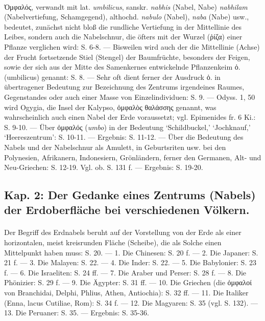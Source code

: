 \documentclass[a4paper, 11pt, oneside]{article}
\begin{document}
\paragraph{}
Ὀμφαλός, verwandt mit lat. \emph{umbilicus}, sanskr. \emph{nabhis} (Nabel, Nabe) \emph{nabhilam} (Nabelvertiefung, Schamgegend), althochd. \emph{nabulo} (Nabel), \emph{naba} (Nabe) usw., bedeutet, zunächst nicht bloß die rundliche Vertiefung in der Mittellinie des Leibes, sondern auch die Nabelschnur, die öfters mit der Wurzel (ῥίζα) einer Pflanze verglichen wird: S. 6-8. --- Bisweilen wird auch der die Mittellinie (Achse) der Frucht fortsetzende Stiel (Stengel) der Baumfrüchte, besonders der Feigen, sowie der sich aus der Mitte des Samenkernes entwickelnde Pflanzenkeim ὀ. (umbilicus) genannt: S. 8. --- Sehr oft dient ferner der Ausdruck ὀ. in übertragener Bedeutung zur Bezeichnung des Zentrums irgendeines Raumes, Gegenstandes oder auch einer Masse von Einzelindividuen: S. 9. --- Odyss. 1, 50 wird Ogygia, die Insel der Kalypso, ὀμφαλὸς θαλάσσης genannt, was wahrscheinlich auch einen Nabel der Erde voraussetzt; vgl. Epimenides fr. 6 Ki.: S. 9-10. --- Über ὀμφαλός (\emph{umbo}) in der Bedeutung `Schildbuckel,' `Jochknauf,' `Heereszentrum': S. 10-11. --- Ergebnis: S. 11-12. --- Über die Bedeutung des Nabels und der Nabelschnur als Amulett, in Geburtsriten usw. bei den Polynesien, Afrikanern, Indonesiern, Grönländern, ferner den Germanen, Alt- und Neu-Griechen: S. 12-19. Vgl. ob. S. 131 f. --- Ergebnis: S. 19-20.

\subsection*{Kap. 2: Der Gedanke eines Zentrums (Nabels) der Erdoberfläche bei verschiedenen Völkern.}
\paragraph{}
Der Begriff des Erdnabels beruht auf der Vorstellung von der Erde als einer horizontalen, meist kreisrunden Fläche (Scheibe), die als Solche einen Mittelpunkt haben muss: S. 20. --- 1. Die Chinesen: S. 20 f. --- 2. Die Japaner: S. 21 f. --- 3. Die Malayen: S. 22. --- 4. Die Inder: S. 22. --- 5. Die Babylonier: S. 23 f. --- 6. Die Israeliten: S. 24 ff. --- 7. Die Araber und Perser: S. 28 f. --- 8. Die Phönizier: S. 29 f. --- 9. Die Ägypter: S. 31 ff. --- 10. Die Griechen (die ὀμφαλοί von Branchidai, Delphi, Phlius, Athen, Antiochia): S. 32 ff. --- 11. Die Italiker (Enna, lacus Cutiliae, Rom): S. 34 f. --- 12. Die Magyaren: S. 35 (vgl. S. 132). --- 13. Die Peruaner: S. 35. --- Ergebnis: S. 35-36.
\end{document}
